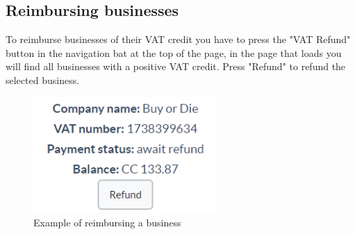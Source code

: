 	\subsection{Reimbursing businesses}
	To reimburse businesses of their VAT credit you have to press the "VAT 
	Refund" button in the navigation bat at the top of the page, in the 
	page that loads you will find all businesses with a positive VAT credit.
	Press "Refund" to refund the selected business.
	\begin{figure}[H]
		\includegraphics[width=7cm]{res/images/business_refund.png}
		\centering
		\caption{Example of reimbursing a business}
	\end{figure}